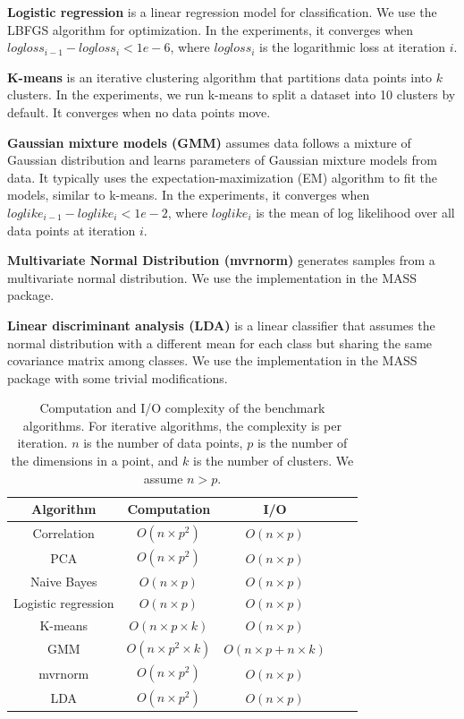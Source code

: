 \noindent \textbf{Logistic regression} is a linear regression model for
classification. We use the LBFGS algorithm \cite{lbfgs} for optimization.
In the experiments, it converges when
$logloss_{i-1}-logloss_i < 1e-6$, where $logloss_i$ is the logarithmic loss
at iteration $i$.

\noindent \textbf{K-means} is an iterative clustering algorithm that
partitions data points into $k$ clusters. In the experiments, we run
k-means to split a dataset into 10 clusters by default. It converges
when no data points move.

\noindent \textbf{Gaussian mixture models (GMM)} assumes data follows
a mixture of Gaussian distribution and learns parameters of Gaussian mixture
models from data. It typically uses the expectation-maximization (EM)
algorithm \cite{em} to fit the models, similar to k-means. In the experiments,
it converges when $loglike_{i-1} - loglike_i < 1e-2$, where $loglike_i$
is the mean of log likelihood over all data points at iteration $i$.

\noindent \textbf{Multivariate Normal Distribution (mvrnorm)} generates
samples from a multivariate normal distribution. We use
the implementation in the MASS package.

\noindent \textbf{Linear discriminant analysis (LDA)} is a linear classifier
that assumes the normal distribution with a different mean for each class
but sharing the same covariance matrix among classes. We use the implementation
in the MASS package with some trivial modifications.

\begin{table}
\begin{center}
\caption{Computation and I/O complexity of the benchmark algorithms. For
	iterative algorithms, the complexity is per iteration. $n$ is the number
	of data points, $p$ is the number of the dimensions in a point, and $k$ is
	the number of clusters. We assume $n > p$.
}
\vspace{-10pt}
\footnotesize
\begin{tabular}{|c|c|c|c|c|}
\hline
Algorithm & Computation & I/O \\
\hline
Correlation & $O(n \times p^2)$ & $O(n \times p)$ \\
\hline
PCA & $O(n \times p^2)$ & $O(n \times p)$ \\
\hline
Naive Bayes & $O(n \times p)$ & $O(n \times p)$ \\
\hline
Logistic regression & $O(n \times p)$ & $O(n \times p)$ \\
\hline
K-means & $O(n \times p \times k)$ & $O(n \times p)$ \\
\hline
GMM & $O(n \times p^2 \times k)$ & $O(n \times p + n \times k)$ \\
\hline
mvrnorm & $O(n \times p^2)$ & $O(n \times p)$ \\
\hline
LDA & $O(n \times p^2)$ & $O(n \times p)$ \\
\hline
\end{tabular}
\normalsize
\label{tbl:algs}
\end{center}
\vspace{-10pt}
\end{table}

